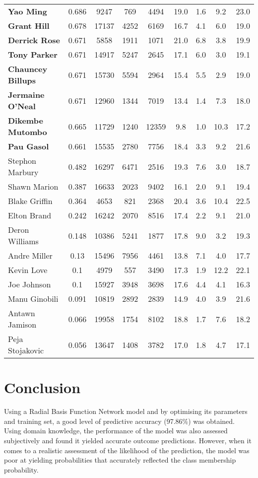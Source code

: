 \documentclass[paper=a4, fontsize=11pt]{scrartcl} %
\numberwithin{equation}{section} %
\numberwithin{figure}{section} %
\numberwithin{table}{section} %
\begin{document}
\begin{table}[thb]
\begin{tabular}{l*{7}{c}r}
\textbf{Yao Ming} & 0.686 & 9247 & 769 & 4494 & 19.0 & 1.6 & 9.2 & 23.0 \\
\textbf{Grant Hill} & 0.678 & 17137 & 4252 & 6169 & 16.7 & 4.1 & 6.0 & 19.0 \\
\textbf{Derrick Rose} & 0.671 & 5858 & 1911 & 1071 & 21.0 & 6.8 & 3.8 & 19.9 \\
\textbf{Tony Parker} & 0.671 & 14917 & 5247 & 2645 & 17.1 & 6.0 & 3.0 & 19.1 \\
\textbf{Chauncey Billups} & 0.671 & 15730 & 5594 & 2964 & 15.4 & 5.5 & 2.9 & 19.0 \\
\textbf{Jermaine O'Neal} & 0.671 & 12960 & 1344 & 7019 & 13.4 & 1.4 & 7.3 & 18.0 \\
\textbf{Dikembe Mutombo} & 0.665 & 11729 & 1240 & 12359 & 9.8 & 1.0 & 10.3 & 17.2 \\
\textbf{Pau Gasol} & 0.661 & 15535 & 2780 & 7756 & 18.4 & 3.3 & 9.2 & 21.6 \\
Stephon Marbury & 0.482 & 16297 & 6471 & 2516 & 19.3 & 7.6 & 3.0 & 18.7 \\
Shawn Marion & 0.387 & 16633 & 2023 & 9402 & 16.1 & 2.0 & 9.1 & 19.4 \\
Blake Griffin & 0.364 & 4653 & 821 & 2368 & 20.4 & 3.6 & 10.4 & 22.5 \\
Elton Brand & 0.242 & 16242 & 2070 & 8516 & 17.4 & 2.2 & 9.1 & 21.0 \\
Deron Williams & 0.148 & 10386 & 5241 & 1877 & 17.8 & 9.0 & 3.2 & 19.3 \\
Andre Miller & 0.13 & 15496 & 7956 & 4461 & 13.8 & 7.1 & 4.0 & 17.7 \\
Kevin Love & 0.1 & 4979 & 557 & 3490 & 17.3 & 1.9 & 12.2 & 22.1 \\
Joe Johnson & 0.1 & 15927 & 3948 & 3698 & 17.6 & 4.4 & 4.1 & 16.3 \\
Manu Ginobili & 0.091 & 10819 & 2892 & 2839 & 14.9 & 4.0 & 3.9 & 21.6 \\
Antawn Jamison & 0.066 & 19958 & 1754 & 8102 & 18.8 & 1.7 & 7.6 & 18.2 \\
Peja Stojakovic & 0.056 & 13647 & 1408 & 3782 & 17.0 & 1.8 & 4.7 & 17.1 \\
\end{tabular}
\end{table}

\section{Conclusion}

Using a Radial Basis Function Network model and by optimising its parameters and training set, a good level of predictive accuracy (97.86\%) was obtained. Using domain knowledge, the performance of the model was also assessed subjectively and found it yielded accurate outcome predictions. However, when it comes to a realistic assessment of the likelihood of the prediction, the model was poor at yielding probabilities that accurately reflected the class membership probability.
\end{document}
